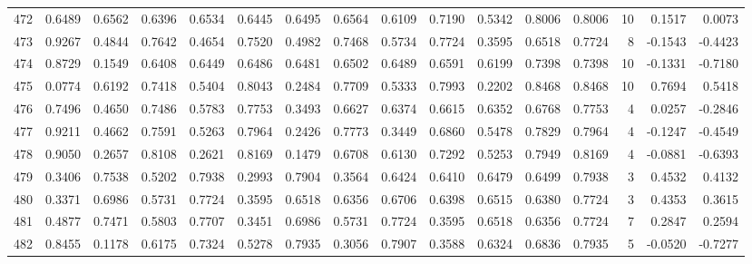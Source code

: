 \begin{tabular}{lrrrrrrrrrrrrrrr}
472 &      0.6489 &  0.6562 &  0.6396 &  0.6534 &  0.6445 &  0.6495 &  0.6564 &  0.6109 &  0.7190 &  0.5342 &   0.8006 &     0.8006 &     10 &                    0.1517 &                     0.0073 \\
473 &      0.9267 &  0.4844 &  0.7642 &  0.4654 &  0.7520 &  0.4982 &  0.7468 &  0.5734 &  0.7724 &  0.3595 &   0.6518 &     0.7724 &      8 &                   -0.1543 &                    -0.4423 \\
474 &      0.8729 &  0.1549 &  0.6408 &  0.6449 &  0.6486 &  0.6481 &  0.6502 &  0.6489 &  0.6591 &  0.6199 &   0.7398 &     0.7398 &     10 &                   -0.1331 &                    -0.7180 \\
475 &      0.0774 &  0.6192 &  0.7418 &  0.5404 &  0.8043 &  0.2484 &  0.7709 &  0.5333 &  0.7993 &  0.2202 &   0.8468 &     0.8468 &     10 &                    0.7694 &                     0.5418 \\
476 &      0.7496 &  0.4650 &  0.7486 &  0.5783 &  0.7753 &  0.3493 &  0.6627 &  0.6374 &  0.6615 &  0.6352 &   0.6768 &     0.7753 &      4 &                    0.0257 &                    -0.2846 \\
477 &      0.9211 &  0.4662 &  0.7591 &  0.5263 &  0.7964 &  0.2426 &  0.7773 &  0.3449 &  0.6860 &  0.5478 &   0.7829 &     0.7964 &      4 &                   -0.1247 &                    -0.4549 \\
478 &      0.9050 &  0.2657 &  0.8108 &  0.2621 &  0.8169 &  0.1479 &  0.6708 &  0.6130 &  0.7292 &  0.5253 &   0.7949 &     0.8169 &      4 &                   -0.0881 &                    -0.6393 \\
479 &      0.3406 &  0.7538 &  0.5202 &  0.7938 &  0.2993 &  0.7904 &  0.3564 &  0.6424 &  0.6410 &  0.6479 &   0.6499 &     0.7938 &      3 &                    0.4532 &                     0.4132 \\
480 &      0.3371 &  0.6986 &  0.5731 &  0.7724 &  0.3595 &  0.6518 &  0.6356 &  0.6706 &  0.6398 &  0.6515 &   0.6380 &     0.7724 &      3 &                    0.4353 &                     0.3615 \\
481 &      0.4877 &  0.7471 &  0.5803 &  0.7707 &  0.3451 &  0.6986 &  0.5731 &  0.7724 &  0.3595 &  0.6518 &   0.6356 &     0.7724 &      7 &                    0.2847 &                     0.2594 \\
482 &      0.8455 &  0.1178 &  0.6175 &  0.7324 &  0.5278 &  0.7935 &  0.3056 &  0.7907 &  0.3588 &  0.6324 &   0.6836 &     0.7935 &      5 &                   -0.0520 &                    -0.7277 \\

\end{tabular}
